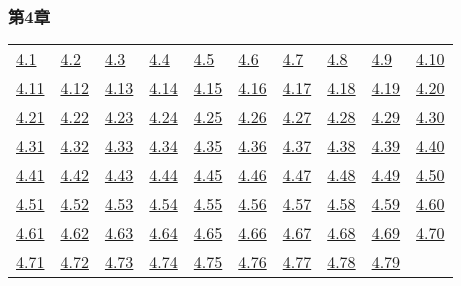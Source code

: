 \subsubsection*{第4章} 

\begin{tabular}{llllllllll}
\hyperref[練習問題 4.1]{4.1} &
\hyperref[練習問題 4.2]{4.2} &
\hyperref[練習問題 4.3]{4.3} &
\hyperref[練習問題 4.4]{4.4} &
\hyperref[練習問題 4.5]{4.5} &
\hyperref[練習問題 4.6]{4.6} &
\hyperref[練習問題 4.7]{4.7} &
\hyperref[練習問題 4.8]{4.8} &
\hyperref[練習問題 4.9]{4.9} &
\hyperref[練習問題 4.10]{4.10}
\\ 
\hyperref[練習問題 4.11]{4.11} &
\hyperref[練習問題 4.12]{4.12} &
\hyperref[練習問題 4.13]{4.13} &
\hyperref[練習問題 4.14]{4.14} &
\hyperref[練習問題 4.15]{4.15} &
\hyperref[練習問題 4.16]{4.16} &
\hyperref[練習問題 4.17]{4.17} &
\hyperref[練習問題 4.18]{4.18} &
\hyperref[練習問題 4.19]{4.19} &
\hyperref[練習問題 4.20]{4.20}
\\ 
\hyperref[練習問題 4.21]{4.21} &
\hyperref[練習問題 4.22]{4.22} &
\hyperref[練習問題 4.23]{4.23} &
\hyperref[練習問題 4.24]{4.24} &
\hyperref[練習問題 4.25]{4.25} &
\hyperref[練習問題 4.26]{4.26} &
\hyperref[練習問題 4.27]{4.27} &
\hyperref[練習問題 4.28]{4.28} &
\hyperref[練習問題 4.29]{4.29} &
\hyperref[練習問題 4.30]{4.30}
\\ 
\hyperref[練習問題 4.31]{4.31} &
\hyperref[練習問題 4.32]{4.32} &
\hyperref[練習問題 4.33]{4.33} &
\hyperref[練習問題 4.34]{4.34} &
\hyperref[練習問題 4.35]{4.35} &
\hyperref[練習問題 4.36]{4.36} &
\hyperref[練習問題 4.37]{4.37} &
\hyperref[練習問題 4.38]{4.38} &
\hyperref[練習問題 4.39]{4.39} &
\hyperref[練習問題 4.40]{4.40}
\\ 
\hyperref[練習問題 4.41]{4.41} &
\hyperref[練習問題 4.42]{4.42} &
\hyperref[練習問題 4.43]{4.43} &
\hyperref[練習問題 4.44]{4.44} &
\hyperref[練習問題 4.45]{4.45} &
\hyperref[練習問題 4.46]{4.46} &
\hyperref[練習問題 4.47]{4.47} &
\hyperref[練習問題 4.48]{4.48} &
\hyperref[練習問題 4.49]{4.49} &
\hyperref[練習問題 4.50]{4.50}
\\ 
\hyperref[練習問題 4.51]{4.51} &
\hyperref[練習問題 4.52]{4.52} &
\hyperref[練習問題 4.53]{4.53} &
\hyperref[練習問題 4.54]{4.54} &
\hyperref[練習問題 4.55]{4.55} &
\hyperref[練習問題 4.56]{4.56} &
\hyperref[練習問題 4.57]{4.57} &
\hyperref[練習問題 4.58]{4.58} &
\hyperref[練習問題 4.59]{4.59} &
\hyperref[練習問題 4.60]{4.60}
\\ 
\hyperref[練習問題 4.61]{4.61} &
\hyperref[練習問題 4.62]{4.62} &
\hyperref[練習問題 4.63]{4.63} &
\hyperref[練習問題 4.64]{4.64} &
\hyperref[練習問題 4.65]{4.65} &
\hyperref[練習問題 4.66]{4.66} &
\hyperref[練習問題 4.67]{4.67} &
\hyperref[練習問題 4.68]{4.68} &
\hyperref[練習問題 4.69]{4.69} &
\hyperref[練習問題 4.70]{4.70}
\\ 
\hyperref[練習問題 4.71]{4.71} &
\hyperref[練習問題 4.72]{4.72} &
\hyperref[練習問題 4.73]{4.73} &
\hyperref[練習問題 4.74]{4.74} &
\hyperref[練習問題 4.75]{4.75} &
\hyperref[練習問題 4.76]{4.76} &
\hyperref[練習問題 4.77]{4.77} &
\hyperref[練習問題 4.78]{4.78} &
\hyperref[練習問題 4.79]{4.79} &
\end{tabular} 

